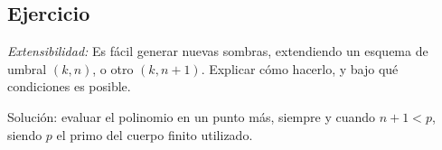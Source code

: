 \documentclass[spanish]{article}
\theoremstyle{definition}
\begin{document}
  \subsection*{Ejercicio}
  \textit{Extensibilidad:} Es fácil generar nuevas sombras, extendiendo un esquema de umbral
  $(k,n)$, o otro $(k, n+1)$. Explicar cómo hacerlo, y bajo qué condiciones es
  posible.

  Solución: evaluar el polinomio en un punto más, siempre y cuando $n+1 < p$,
  siendo $p$ el primo del cuerpo finito utilizado.

%
%
\end{document}
